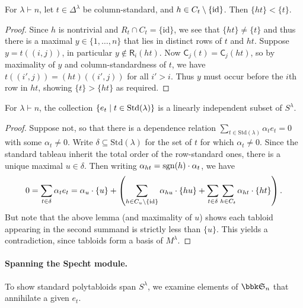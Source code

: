 \begin{lemma}
    For $\lambda\vdash n$, let $t\in \Delta^\lambda$ be column-standard, and
    $h\in C_t\setminus\{\textnormal{id}\}$. Then $\{ht\}<\{t\}$.

    \begin{proof}
        Since $h$ is nontrivial and $R_t\cap C_t=\{\text{id}\}$, we see that
        $\{ht\}\neq \{t\}$ and thus there is a maximal $y\in\{1,\ldots,n\}$ that
        lies in distinct rows of $t$ and $ht$. Suppose $y=t((i,j))$, in
        particular $y\notin \mathsf{R}_i(ht)$. Now
        $\mathsf{C}_j(t)=\mathsf{C}_j(ht)$, so by maximality of $y$ and
        column-standardness of $t$, we have $t((i',j))=(ht)((i',j))$ for all
        $i'>i$. Thus $y$ must occur before the $i$th row in $ht$, showing
        $\{t\}>\{ht\}$ as required.
    \end{proof}
\end{lemma}

\begin{proposition}
    For $\lambda\vdash n$, the collection $\{e_t\;|\; t\in
    \textnormal{Std}(\lambda)\}$ is a linearly independent subset of
    $S^\lambda$.
    \begin{proof}
        Suppose not, so that there is a dependence relation $\sum_{t\in
        \text{Std}(\lambda)} \alpha_te_t=0$ with some $\alpha_t\neq 0$. Write
        $\delta\subseteq\text{Std}(\lambda)$ for the set of $t$ for which
        $\alpha_t\neq 0$. Since
        the standard tableau inherit the total order of the row-standard ones,
        there is a unique maximal $u\in \delta$. Then writing
        $\alpha_{ht}=\textnormal{sgn}(h)\cdot \alpha_t$, we have 
        \[
            0 = \sum_{t\in \delta}\alpha_t e_t = \alpha_u \cdot \{u\} +
            \left(\sum_{h\in C_u\setminus \{\textnormal{id}\}} \alpha_{hu}\cdot
            \{hu\} + \sum_{t\in\delta}\sum_{h\in C_t} \alpha_{ht}\cdot \{ht\}
            \right). 
        \]
        But note that the above lemma (and maximality of $u$) shows each tabloid
        appearing in the second summand is strictly less than $\{u\}$. This
        yields a contradiction, since tabloids form a basis of $M^\lambda$.
    \end{proof}
\end{proposition}

\paragraph{Spanning the Specht module.} To show standard polytabloids span
$S^\lambda$, we examine elements of $\bbk \sym n$ that annihilate a given $e_t$.

